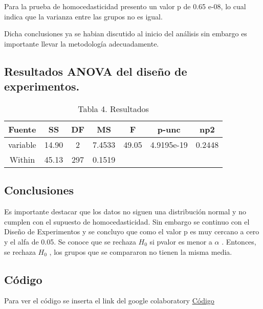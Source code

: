 \documentclass{article}
\begin{document}
Para la prueba de homocedasticidad presento un valor p de 0.65 e-08, lo cual indica que la varianza entre las grupos no es igual.

Dicha conclusiones ya se habian discutido al inicio del análisis sin embargo es importante llevar la metodología adecuadamente.

\subsection{Resultados ANOVA del diseño de experimentos.}

\begin{table}[hbt!]
\begin{center}
\begin{tabular}{| c | c |c|c|c|c|c|}
\hline
Fuente & SS & DF & MS & F & p-unc & np2 \\ \hline
variable & 14.90 & 2 & 7.4533 & 49.05 & 4.9195e-19& 0.2448\\
Within & 45.13 & 297& 0.1519 & & & \\
\hline
\end{tabular}
\caption{Tabla 4. Resultados}
\label{tab:fruta}
\end{center}
\end{table}

\subsection{Conclusiones}

Es importante destacar que los datos no siguen una distribución normal y no cumplen con el supuesto de homocedasticidad. Sin embargo se continuo con el Diseño de Experimentos y se concluyo que como el valor p es muy cercano a cero y el alfa de 0.05. Se conoce que se rechaza  $H_0$  si pvalor es menor a $\alpha$ . Entonces, se rechaza  $H_0$  , los grupos que se compararon no tienen la misma media.

\subsection{Código}

Para ver el código se inserta el link del google colaboratory \href{https://colab.research.google.com/drive/1Dz6kdRQumlq7QdE-JnC32MI8lGVy-82R?usp=sharing}{Código} 
 



\end{document}
